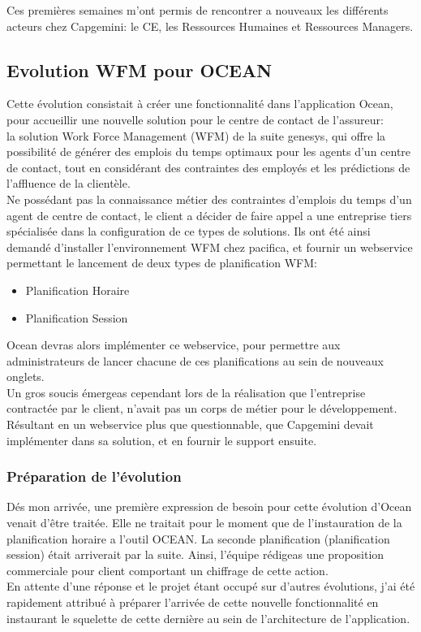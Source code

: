 \documentclass{rapport}
\begin{document}
Ces premières semaines m'ont permis de rencontrer a nouveaux les différents acteurs chez Capgemini: le CE, les Ressources Humaines et Ressources Managers.\\ 

\newpage
\subsection{Evolution WFM pour OCEAN}

Cette évolution consistait à créer une fonctionnalité dans l'application Ocean, pour accueillir une nouvelle solution pour le centre de contact de l'assureur: \\
la solution Work Force Management (WFM) de la suite genesys, qui offre la possibilité de générer des emplois du temps optimaux pour les agents d'un centre de contact, tout en considérant des contraintes des employés et les prédictions de l'affluence de la clientèle.\\

Ne possédant pas la connaissance métier des contraintes d'emplois du temps d'un agent de centre de contact, le client a décider de faire appel a une entreprise tiers spécialisée dans la configuration de ce types de solutions. Ils ont été ainsi demandé d'installer l'environnement WFM chez pacifica, et fournir un webservice permettant le lancement de deux types de planification WFM:
\begin{itemize}
  \item Planification Horaire
  \item Planification Session
\end{itemize}

Ocean devras alors implémenter ce webservice, pour permettre aux administrateurs de lancer chacune de ces planifications au sein de nouveaux onglets.\\

Un gros soucis émergeas cependant lors de la réalisation que l'entreprise contractée par le client, n'avait pas un corps de métier pour le développement. Résultant en un webservice plus que questionnable, que Capgemini devait implémenter dans sa solution, et en fournir le support ensuite.

\subsubsection{Préparation de l'évolution}

Dés mon arrivée, une première expression de besoin pour cette évolution d'Ocean venait d'être traitée. Elle ne traitait pour le moment que de l'instauration de la planification horaire a l'outil OCEAN. La seconde planification (planification session) était arriverait par la suite. Ainsi, l'équipe rédigeas une proposition commerciale pour client comportant un chiffrage de cette action.\\
En attente d'une réponse et le projet étant occupé sur d'autres évolutions, j'ai été rapidement attribué à préparer l'arrivée de cette nouvelle fonctionnalité en instaurant le squelette de cette dernière au sein de l'architecture de l'application.\\
\end{document}
